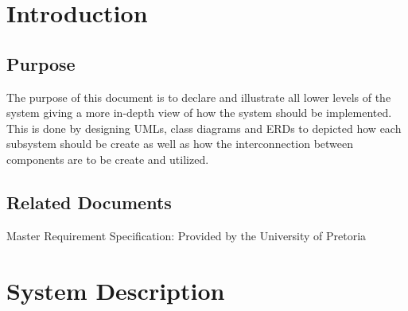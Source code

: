 \documentclass[12pt]{article}
\begin{document}
\newpage


\tableofcontents

\newpage


\section{Introduction}

	\subsection{Purpose}

		\vspace{0.5cm}
		
		The purpose of this document is to declare and illustrate all lower levels of the system giving a more in-depth view of how the system should be implemented. This is done by designing UMLs, class diagrams and ERDs to depicted how each subsystem should be create as well as how the interconnection between components are to be create and utilized.

		\vspace{0.5cm}
		
	\subsection{Related Documents}

		\vspace{0.5cm}
		
		Master Requirement Specification: Provided by the University of Pretoria
		
		\vspace{0.5cm}

\section{System Description}

		\vspace{0.5cm}
		
\end{document}
